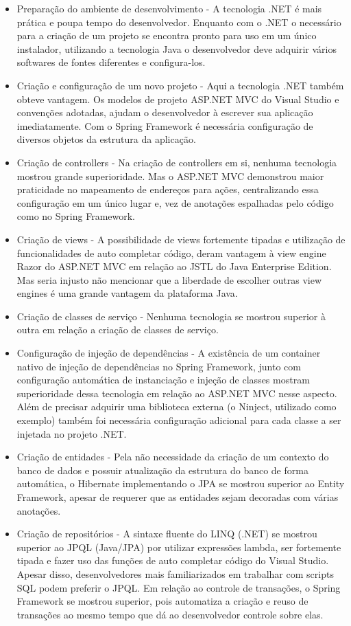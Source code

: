 \documentclass[a4paper,12pt]{article}
\begin{document}
\begin{itemize}
  \item Preparação do ambiente de desenvolvimento - A tecnologia .NET é mais prática e poupa tempo do desenvolvedor. Enquanto com o .NET o necessário para a criação de um projeto se encontra pronto para uso em um único instalador, utilizando a tecnologia Java o desenvolvedor deve adquirir vários softwares de fontes diferentes e configura-los.
  \item Criação e configuração de um novo projeto - Aqui a tecnologia .NET também obteve vantagem. Os modelos de projeto ASP.NET MVC do Visual Studio e convenções adotadas, ajudam o desenvolvedor à escrever sua aplicação imediatamente. Com o Spring Framework é necessária configuração de diversos objetos da estrutura da aplicação.
  \item Criação de controllers - Na criação de controllers em si, nenhuma tecnologia mostrou grande superioridade. Mas o ASP.NET MVC demonstrou maior praticidade no mapeamento de endereços para ações, centralizando essa configuração em um único lugar e, vez de anotações espalhadas pelo código como no Spring Framework.
  \item Criação de views - A possibilidade de views fortemente tipadas e utilização de funcionalidades de auto completar código, deram vantagem à view engine Razor do ASP.NET MVC em relação ao JSTL do Java Enterprise Edition. Mas seria injusto não mencionar que a liberdade de escolher outras view engines é uma grande vantagem da plataforma Java.
  \item Criação de classes de serviço - Nenhuma tecnologia se mostrou superior à outra em relação a criação de classes de serviço.
  \item Configuração de injeção de dependências - A existência de um container nativo de injeção de dependências no Spring Framework, junto com configuração automática de instanciação e injeção de classes mostram superioridade dessa tecnologia em relação ao ASP.NET MVC nesse aspecto. Além de precisar adquirir uma biblioteca externa (o Ninject, utilizado como exemplo) também foi necessária configuração adicional para cada classe a ser injetada no projeto .NET.
  \item Criação de entidades - Pela não necessidade da criação de um contexto do banco de dados e possuir atualização da estrutura do banco de forma automática, o Hibernate implementando o JPA se mostrou superior ao Entity Framework, apesar de requerer que as entidades sejam decoradas com várias anotações.
  \item Criação de repositórios - A sintaxe fluente do LINQ (.NET) se mostrou superior ao JPQL (Java/JPA) por utilizar expressões lambda, ser fortemente tipada e fazer uso das funções de auto completar código do Visual Studio. Apesar disso, desenvolvedores mais familiarizados em trabalhar com scripts SQL podem preferir o JPQL. Em relação ao controle de transações, o Spring Framework se mostrou superior, pois automatiza a criação e reuso de transações ao mesmo tempo que dá ao desenvolvedor controle sobre elas. 
\end{itemize}
\end{document}
